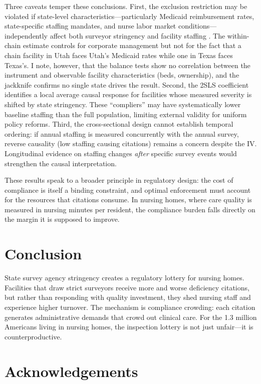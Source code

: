 \documentclass[12pt]{article}
\begin{document}
Three caveats temper these conclusions. First, the exclusion restriction may be violated if state-level characteristics---particularly Medicaid reimbursement rates, state-specific staffing mandates, and nurse labor market conditions---independently affect both surveyor stringency and facility staffing \citep{Hackmann2019}. The within-chain estimate controls for corporate management but not for the fact that a chain facility in Utah faces Utah's Medicaid rates while one in Texas faces Texas's. I note, however, that the balance tests show no correlation between the instrument and observable facility characteristics (beds, ownership), and the jackknife confirms no single state drives the result. Second, the 2SLS coefficient identifies a local average causal response for facilities whose measured severity is shifted by state stringency. These ``compliers'' may have systematically lower baseline staffing than the full population, limiting external validity for uniform policy reforms. Third, the cross-sectional design cannot establish temporal ordering: if annual staffing is measured concurrently with the annual survey, reverse causality (low staffing causing citations) remains a concern despite the IV. Longitudinal evidence on staffing changes \textit{after} specific survey events would strengthen the causal interpretation.

These results speak to a broader principle in regulatory design: the cost of compliance is itself a binding constraint, and optimal enforcement must account for the resources that citations consume. In nursing homes, where care quality is measured in nursing minutes per resident, the compliance burden falls directly on the margin it is supposed to improve.

\section{Conclusion}

State survey agency stringency creates a regulatory lottery for nursing homes. Facilities that draw strict surveyors receive more and worse deficiency citations, but rather than responding with quality investment, they shed nursing staff and experience higher turnover. The mechanism is compliance crowding: each citation generates administrative demands that crowd out clinical care. For the 1.3 million Americans living in nursing homes, the inspection lottery is not just unfair---it is counterproductive.

\section*{Acknowledgements}
\end{document}
